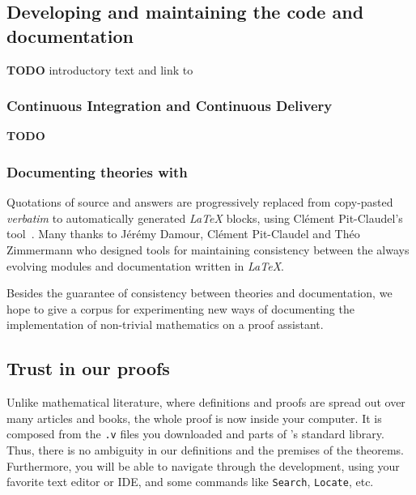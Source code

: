 \documentclass[twoside,a4paper]{book}
\begin{document}
 
 
 \subsection{Developing and maintaining the \coq code and documentation}

 \textbf{TODO} introductory text and link to \cite{jfla2022}
 
 \subsubsection{Continuous Integration and Continuous Delivery}

 \textbf{TODO}

 
 
\subsubsection{Documenting theories with \alectr}

Quotations of \coq source and answers are progressively replaced from copy-pasted \emph{verbatim} to automatically generated \emph{LaTeX} blocks, using Clément Pit-Claudel's \alectr  tool~\cite{alectryonpaper, alectryongithub}.
Many thanks to Jérémy Damour, Clément Pit-Claudel  and Théo Zimmermann who designed tools for maintaining consistency between the always evolving \coq{} modules and documentation written in \emph{LaTeX}.

Besides the guarantee of consistency between theories and documentation, we hope to give a corpus for experimenting new ways of documenting the implementation of non-trivial mathematics on a proof assistant.

\subsection{Trust in our proofs}
\label{sect:trust-in-proofs}

Unlike mathematical literature, where definitions and proofs are spread out over many articles and books,
the whole proof is now inside your computer. It is composed from the \texttt{.v} files you downloaded and
parts of \coq's standard library. Thus, there is no ambiguity in our definitions and the premises of the theorems. Furthermore, you will be able to navigate through the development, using your favorite text editor or IDE, and some commands like \texttt{Search}, \texttt{Locate},  etc.
\end{document}
